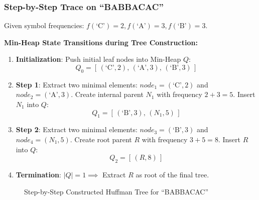 \documentclass{article}
\begin{document}
\subsubsection{Step-by-Step Trace on ``BABBACAC''}
Given symbol frequencies: $f(\text{`C'}) = 2, f(\text{`A'}) = 3, f(\text{`B'}) = 3$.

\noindent\textbf{Min-Heap State Transitions during Tree Construction:}
\begin{enumerate}
    \item \textbf{Initialization}: Push initial leaf nodes into Min-Heap $Q$:
    \begin{equation*}
        Q_0 = [\, (\text{`C'}, 2),\, (\text{`A'}, 3),\, (\text{`B'}, 3) \,]
    \end{equation*}
    \item \textbf{Step 1}: Extract two minimal elements: $node_1 = (\text{`C'}, 2)$ and $node_2 = (\text{`A'}, 3)$. Create internal parent $N_1$ with frequency $2+3=5$. Insert $N_1$ into $Q$:
    \begin{equation*}
        Q_1 = [\, (\text{`B'}, 3),\, (N_1, 5) \,]
    \end{equation*}
    \item \textbf{Step 2}: Extract two minimal elements: $node_3 = (\text{`B'}, 3)$ and $node_4 = (N_1, 5)$. Create root parent $R$ with frequency $3+5=8$. Insert $R$ into $Q$:
    \begin{equation*}
        Q_2 = [\, (R, 8) \,]
    \end{equation*}
    \item \textbf{Termination}: $|Q| = 1 \implies$ Extract $R$ as root of the final tree.
\end{enumerate}

\begin{figure}[H]
\centering
{}
\caption{Step-by-Step Constructed Huffman Tree for ``BABBACAC''}
\label{fig:huffman_tree}
\end{figure}
\end{document}
